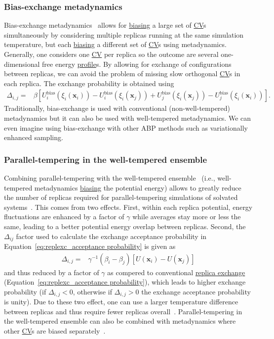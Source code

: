 \documentclass[9pt,review]{livecoms}
\newcommand{\vx}{\mathbf{x}}
\begin{document}
\subsubsection{Bias-exchange metadynamics}
\label{sec:be-metad}
Bias-exchange metadynamics~\cite{Piana2007_bemeta} allows for \hyperlink{ref:biasingE} {biasing} a large set of \hyperlink{ref:CV} {CV}s simultaneously by considering multiple replicas running at the same simulation temperature, but each \hyperlink{ref:biasingE} {biasing} a different set of \hyperlink{ref:CV} {CV}s using metadynamics. Generally, one considers one \hyperlink{ref:CV} {CV} per replica so the outcome are several one-dimensional free energy \hyperlink{ref:FES} {profile}s. By allowing for exchange of configurations between replicas, we can avoid the problem of missing slow orthogonal \hyperlink{ref:CV} {CV}s in each replica.
The exchange probability is obtained using
\begin{align}
\Delta_{i,j} = &
\beta \left[
U^{\mathrm{bias}}_{i}(\xi_{i}(\vx_{i})) - U^{\mathrm{bias}}_{i}(\xi_{i}(\vx_{j})) +
U^{\mathrm{bias}}_{j}(\xi_{i}(\vx_{j})) - U^{\mathrm{bias}}_{j}(\xi_{i}(\vx_{i}))
\right].
\end{align}
Traditionally, bias-exchange is used with conventional (non-well-tempered) metadynamics but it can also be used with well-tempered metadynamics. We can even imagine using bias-exchange with other ABP methods such as variationally enhanced sampling.
%

\subsubsection{Parallel-tempering in the well-tempered ensemble}
\label{sec:pt-wte}
Combining parallel-tempering with the well-tempered ensemble~\cite{Bonomi-PRL-2010} (i.e., well-tempered metadynamics \hyperlink{ref:biasingE} {biasing} the potential energy) allows to greatly reduce the number of replicas required for parallel-tempering simulations of solvated systems~\cite{Deighan2012_ptwte_efficient}. This comes from two effects. First, within each replica potential, energy fluctuations are enhanced by a factor of $\gamma$ while averages stay more or less the same, leading to a better potential energy overlap between replicas. Second, the $\Delta_{ij}$ factor used to calculate the exchange acceptance probability in Equation~\ref{eq:replexc_acceptance probability} is given as
\begin{align}
\Delta_{i,j} = &
\gamma^{-1}
\left(\beta_{i} - \beta_{j}\right)
\left[U(\vx_{i}) - U(\vx_{j})\right]
\end{align}
and thus reduced by a factor of $\gamma$ as compered to conventional \hyperlink{ref:ReplEx} {replica exchange} (Equation~\ref{eq:replexc_acceptance probability}),  which leads to higher exchange probability (if $\Delta_{i,j}<0$, otherwise if $\Delta_{i,j}>0$ the exchange acceptance probability is unity). Due to these two effect, one can use a larger temperature difference between replicas and thus require fewer replicas overall~\cite{Deighan2012_ptwte_efficient}. Parallel-tempering in the well-tempered ensemble can also be combined with metadynamics where other \hyperlink{ref:CV} {CV}s are biased separately~\cite{10.1073/pnas.1320077110}.
\end{document}
